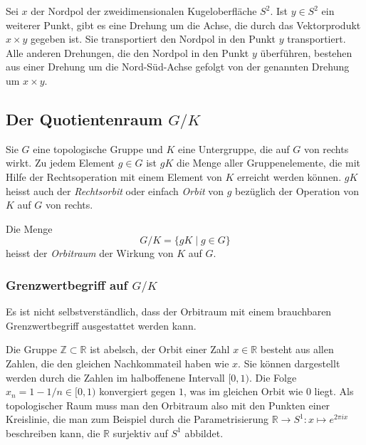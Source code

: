 \begin{beispiel}
Sei $x$ der Nordpol der zweidimensionalen Kugeloberfläche $S^2$.
Ist $y\in S^2$ ein weiterer Punkt, gibt es eine Drehung um die Achse,
die durch das Vektorprodukt
$x\times y$ gegeben ist.
Sie transportiert den Nordpol in den Punkt $y$ transportiert.
Alle anderen Drehungen, die den Nordpol in den Punkt $y$ überführen,
bestehen aus einer Drehung um die Nord-Süd-Achse gefolgt von der
genannten Drehung um $x\times y$.
\end{beispiel}

%
%
\subsection{Der Quotientenraum $G/K$
\label{buch:nichtkomm:homogen:subsection:quotientgk}}
Sie $G$ eine topologische Gruppe und $K$ eine Untergruppe, die auf $G$
von rechts wirkt.
Zu jedem Element $g\in G$ ist $gK$ die Menge aller Gruppenelemente, 
die mit Hilfe der Rechtsoperation mit einem Element von $K$ erreicht
werden können.
$gK$ heisst auch der {\em Rechtsorbit} oder einfach {\em Orbit} von $g$
bezüglich der Operation von $K$ auf $G$ von rechts.

\begin{definition}[Orbitraum]
Die Menge 
\[
G/K
=
\{ gK \mid g\in G\}
\]
heisst der {\em Orbitraum} der Wirkung von $K$ auf $G$.
\end{definition}

%
%
\subsubsection{Grenzwertbegriff auf $G/K$}
Es ist nicht selbstverständlich, dass der Orbitraum
mit einem brauchbaren Grenzwertbegriff ausgestattet
werden kann.

\begin{beispiel}
Die Gruppe $\mathbb{Z}\subset\mathbb{R}$ ist abelsch, der Orbit einer
Zahl $x\in\mathbb{R}$ besteht aus allen Zahlen, die den gleichen
Nachkommateil haben wie $x$.
Sie können dargestellt werden durch die Zahlen im halboffenene
Intervall $[0,1)$.
Die Folge $x_n = 1-1/n\in [0,1)$ konvergiert gegen $1$, was im gleichen
Orbit wie $0$ liegt.
Als topologischer Raum muss man den Orbitraum also mit den
Punkten einer Kreislinie, die man zum Beispiel durch die
Parametrisierung $\mathbb{R}\to S^1:x\mapsto e^{2\pi ix}$ 
beschreiben kann, die $\mathbb{R}$ surjektiv auf $S^1$ abbildet.
\end{beispiel}

